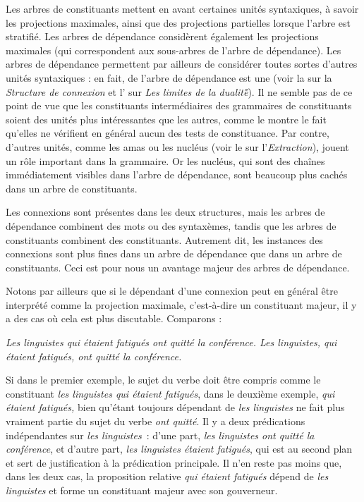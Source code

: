 {    
    Les arbres de constituants mettent en avant certaines unités syntaxiques, à savoir les projections maximales, ainsi que des projections partielles lorsque l’arbre est stratifié. Les arbres de dépendance considèrent également les projections maximales (qui correspondent aux sous-arbres de l’arbre de dépendance). Les arbres de dépendance permettent par ailleurs de considérer toutes sortes d’autres unités syntaxiques : en fait,  de l’arbre de dépendance est une  (voir la  sur la \textit{Structure de connexion} et l' sur \textit{{Les limites de la dualité}}́). Il ne semble pas de ce point de vue que les constituants intermédiaires des grammaires de constituants soient des unités plus intéressantes que les autres, comme le montre le fait qu’elles ne vérifient en général aucun des tests de constituance. Par contre, d’autres unités, comme les amas ou les nucléus (voir le  sur l’\textit{Extraction}), jouent un rôle important dans la grammaire. Or les nucléus, qui sont des chaînes immédiatement visibles dans l’arbre de dépendance, sont beaucoup plus cachés dans un arbre de constituants.

    Les connexions sont présentes dans les deux structures, mais les arbres de dépendance combinent des mots ou des syntaxèmes, tandis que les arbres de constituants combinent des constituants. Autrement dit, les instances des connexions sont plus fines dans un arbre de dépendance que dans un arbre de constituants. Ceci est pour nous un avantage majeur des arbres de dépendance.

    Notons par ailleurs que si le dépendant d’une connexion peut en général être interprété comme la projection maximale, c’est-à-dire un constituant majeur, il y a des cas où cela est plus discutable. Comparons :\tcbbreak

    \ea
    \ea \itshape Les linguistes qui étaient fatigués ont quitté la conférence.
    \ex \itshape Les linguistes, qui étaient fatigués, ont quitté la conférence.
    \z
    \z

    Si dans le premier exemple, le sujet du verbe doit être compris comme le constituant \textit{les linguistes qui étaient fatigués}, dans le deuxième exemple, \textit{qui étaient fatigués,} bien qu’étant toujours dépendant de \textit{les linguistes} ne fait plus vraiment partie du sujet du verbe \textit{ont quitté}. Il y a deux prédications indépendantes sur \textit{les linguistes~}: d’une part, \textit{les linguistes ont quitté la conférence}, et d’autre part, \textit{les linguistes étaient fatigués}, qui est au second plan et sert de justification à la prédication principale.
    Il n'en reste pas moins que, dans les deux cas, la proposition relative \textit{qui étaient fatigués} dépend de \textit{les linguistes} et forme un constituant majeur avec son gouverneur.

}
